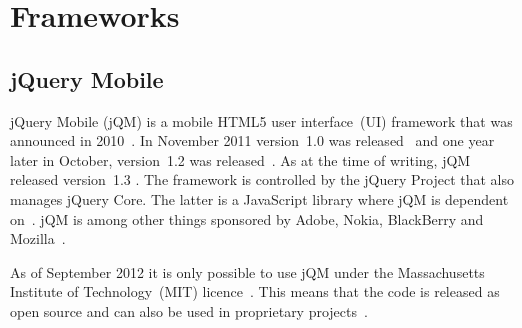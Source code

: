 \documentclass[a4paper]{artikel3}
\renewcommand{\paragraph}[1]{\vspace{2mm} \noindent {\bf #1}  }
\begin{document}


\section{Frameworks} %
\label{sec:frameworks}

\subsection{jQuery Mobile} %
\label{sec:jqm}

jQuery Mobile (jQM) is a mobile HTML5 user interface~(UI) framework that was announced in 2010~\cite{Resig2010}. 
In November 2011 version~1.0 was released~\cite{Parker2011} and one year later in October, version~1.2 was released~\cite{Parker2012}. 
As at the time of writing, jQM released version~1.3 \cite{Parker2013a}.
The framework is controlled by the jQuery Project that also manages jQuery Core. 
The latter is a JavaScript library where jQM is dependent on~\cite{JQuery2012}. 
jQM is among other things sponsored by Adobe, Nokia, BlackBerry and Mozilla~\cite{JQuery2012a}.

\paragraph{Licence}
As of September 2012 it is only possible to use jQM under the Massachusetts Institute of Technology~(MIT) licence~\cite{Dmethvin2012}. 
This means that the code is released as open source and can also be used in proprietary projects~\cite{PhilDutson2012}.
\end{document}
